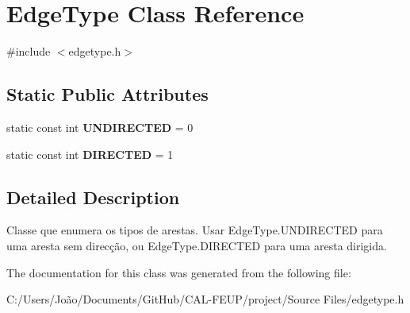 \hypertarget{class_edge_type}{}\section{Edge\+Type Class Reference}
\label{class_edge_type}


{\ttfamily \#include $<$edgetype.\+h$>$}

\subsection*{Static Public Attributes}
\begin{DoxyCompactItemize}
\item 
\mbox{\label{class_edge_type_a6533cc56d05c288a550b9980b66c9317}} 
static const int {\bfseries U\+N\+D\+I\+R\+E\+C\+T\+ED} = 0
\item 
\mbox{\label{class_edge_type_a903017a534f2818c2d17145e4ae0321c}} 
static const int {\bfseries D\+I\+R\+E\+C\+T\+ED} = 1
\end{DoxyCompactItemize}


\subsection{Detailed Description}
Classe que enumera os tipos de arestas. Usar Edge\+Type.\+U\+N\+D\+I\+R\+E\+C\+T\+ED para uma aresta sem direcção, ou Edge\+Type.\+D\+I\+R\+E\+C\+T\+ED para uma aresta dirigida. 

The documentation for this class was generated from the following file\+:\begin{DoxyCompactItemize}
\item 
C\+:/\+Users/\+João/\+Documents/\+Git\+Hub/\+C\+A\+L-\/\+F\+E\+U\+P/project/\+Source Files/edgetype.\+h\end{DoxyCompactItemize}
